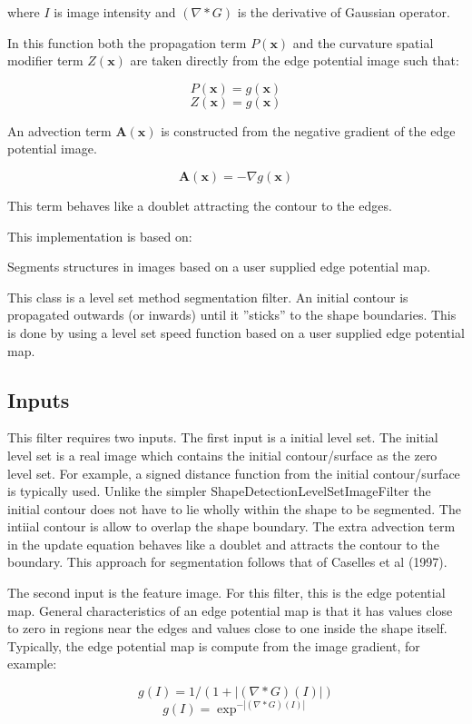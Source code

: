 \documentclass{article}
\begin{document}
where $I$ is image intensity and $ (\nabla * G) $ is the derivative of Gaussian operator.


In this function both the propagation term $ P(\mathbf{x}) $ and the curvature spatial modifier term $ Z(\mathbf{x}) $ are taken directly from the edge potential image such that:

\[ P(\mathbf{x}) = g(\mathbf{x}) \]
\[ Z(\mathbf{x}) = g(\mathbf{x}) \]


An advection term $ \mathbf{A}(\mathbf{x}) $ is constructed from the negative gradient of the edge potential image.

\[ \mathbf{A}(\mathbf{x}) = -\nabla g(\mathbf{x}) \]

This term behaves like a doublet attracting the contour to the edges.


This implementation is based on: \cite{GEO}


Segments structures in images based on a user supplied edge potential map.


This class is a level set method segmentation filter. An initial contour is propagated outwards (or inwards) until it ''sticks'' to the shape boundaries. This is done by using a level set speed function based on a user supplied edge potential map.

\subsection{Inputs}
This filter requires two inputs. The first input is a initial level set. The initial level set is a real image which contains the initial contour/surface as the zero level set. For example, a signed distance function from the initial contour/surface is typically used. Unlike the simpler ShapeDetectionLevelSetImageFilter the initial contour does not have to lie wholly within the shape to be segmented. The intiial contour is allow to overlap the shape boundary. The extra advection term in the update equation behaves like a doublet and attracts the contour to the boundary. This approach for segmentation follows that of Caselles et al (1997).


The second input is the feature image. For this filter, this is the edge potential map. General characteristics of an edge potential map is that it has values close to zero in regions near the edges and values close to one inside the shape itself. Typically, the edge potential map is compute from the image gradient, for example:

\[ g(I) = 1 / ( 1 + | (\nabla * G)(I)| ) \]
\[ g(I) = \exp^{-|(\nabla * G)(I)|} \]
\end{document}
